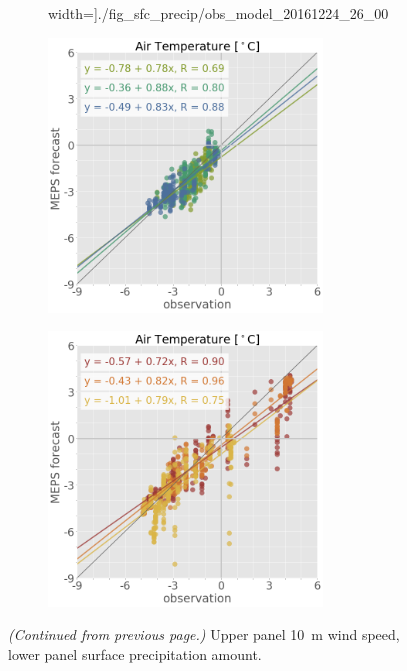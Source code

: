 \begin{figure}
\begin{subfigure}[b]{0.49\textwidth}
		width=\textwidth]{./fig_sfc_precip/obs_model_20161224_26_00}
		\caption{}\label{fig:scat:precip2426}
	\end{subfigure}
	\begin{subfigure}[b]{0.49\textwidth}
		\centering
		\includegraphics[trim={25.cm 15.5cm 0cm 3.6cm},clip,
		width=0.8\textwidth]{./fig_sfc_temp/obs_model_20161221_23_00}
	\end{subfigure}
	\begin{subfigure}[b]{0.49\textwidth}
		\centering
		\includegraphics[trim={25.cm 15.5cm 0cm 3.6cm},clip,
		width=0.8\textwidth]{./fig_sfc_temp/obs_model_20161224_26_00}
	\end{subfigure}
	\caption{\textit{(Continued from previous page.)} Upper panel \SI{10}{\metre} wind speed, lower panel surface precipitation amount. }
\end{figure}
